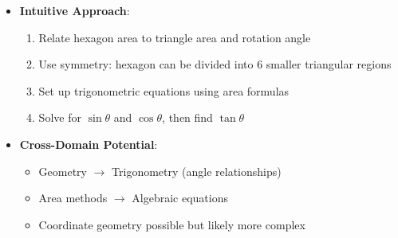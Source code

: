 \documentclass[12pt]{article}
\begin{document}
\begin{problemconfigbox}
\begin{itemize}[leftmargin=*]
    \item \textbf{Intuitive Approach}: 
    \begin{enumerate}
        \item Relate hexagon area to triangle area and rotation angle
        \item Use symmetry: hexagon can be divided into 6 smaller triangular regions
        \item Set up trigonometric equations using area formulas
        \item Solve for $\sin\theta$ and $\cos\theta$, then find $\tan\theta$
    \end{enumerate}
    
    \item \textbf{Cross-Domain Potential}: 
    \begin{itemize}
        \item Geometry $\rightarrow$ Trigonometry (angle relationships)
        \item Area methods $\rightarrow$ Algebraic equations
        \item Coordinate geometry possible but likely more complex
    \end{itemize}
\end{itemize}
\end{problemconfigbox}
\end{document}
